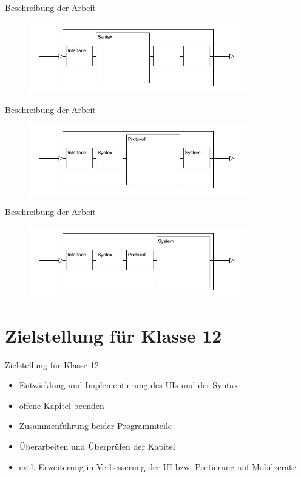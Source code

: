 \documentclass{beamer}
\begin{document}
\begin{frame}{Beschreibung der Arbeit}
\begin{figure}
\includegraphics[width=9.5cm]{syn.jpg}
\end{figure}
\end{frame}

\begin{frame}{Beschreibung der Arbeit}
\begin{figure}
\includegraphics[width=9.5cm]{pro.jpg}
\end{figure}
\end{frame}

\begin{frame}{Beschreibung der Arbeit}
\begin{figure}
\includegraphics[width=9.5cm]{sys.jpg}
\end{figure}
\end{frame}


\section{Zielstellung für Klasse 12}
\begin{frame}{Zielstellung für Klasse 12}
\pause
\begin{itemize}
\item Entwicklung und Implementierung des UIs und der Syntax
\pause
\item offene Kapitel beenden
\pause
\item Zusammenführung beider Programmteile
\pause
\item Überarbeiten und Überprüfen der Kapitel
\pause
\item evtl. Erweiterung in Verbesserung der UI bzw. Portierung auf Mobilgeräte
\end{itemize}
\end{frame}
\end{document}
